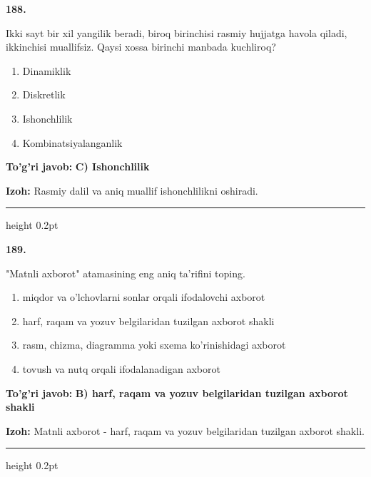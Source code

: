 \documentclass[10pt,a4paper,oneside]{article}
\begin{document}
\noindent\textbf{\color{ink}188.}
\par
Ikki sayt bir xil yangilik beradi, biroq birinchisi rasmiy hujjatga havola qiladi, ikkinchisi muallifsiz. Qaysi xossa birinchi manbada kuchliroq?
\begin{enumerate}[label=\Alph*),leftmargin=9mm]
\item Dinamiklik
\item Diskretlik
\item Ishonchlilik
\item Kombinatsiyalanganlik
\end{enumerate}
\begin{tcolorbox}[enhanced,breakable,colback=teal!4,colframe=teal!50!black,boxrule=0.5pt,arc=1.1mm,left=3mm,right=3mm,top=1.7mm,bottom=1.7mm,before skip=2mm,after skip=2mm]
\textbf{\color{teal}To'g'ri javob:} \textbf{C) Ishonchlilik}
\par\smallskip
\textbf{Izoh:} Rasmiy dalil va aniq muallif ishonchlilikni oshiradi.
\end{tcolorbox}
\vspace{2mm}\hrule height 0.2pt \vspace{3mm}

\noindent\textbf{\color{ink}189.}
\par
"Matnli axborot" atamasining eng aniq ta'rifini toping.
\begin{enumerate}[label=\Alph*),leftmargin=9mm]
\item miqdor va o'lchovlarni sonlar orqali ifodalovchi axborot
\item harf, raqam va yozuv belgilaridan tuzilgan axborot shakli
\item rasm, chizma, diagramma yoki sxema ko'rinishidagi axborot
\item tovush va nutq orqali ifodalanadigan axborot
\end{enumerate}
\begin{tcolorbox}[enhanced,breakable,colback=teal!4,colframe=teal!50!black,boxrule=0.5pt,arc=1.1mm,left=3mm,right=3mm,top=1.7mm,bottom=1.7mm,before skip=2mm,after skip=2mm]
\textbf{\color{teal}To'g'ri javob:} \textbf{B) harf, raqam va yozuv belgilaridan tuzilgan axborot shakli}
\par\smallskip
\textbf{Izoh:} Matnli axborot - harf, raqam va yozuv belgilaridan tuzilgan axborot shakli.
\end{tcolorbox}
\vspace{2mm}\hrule height 0.2pt \vspace{3mm}
\end{document}

